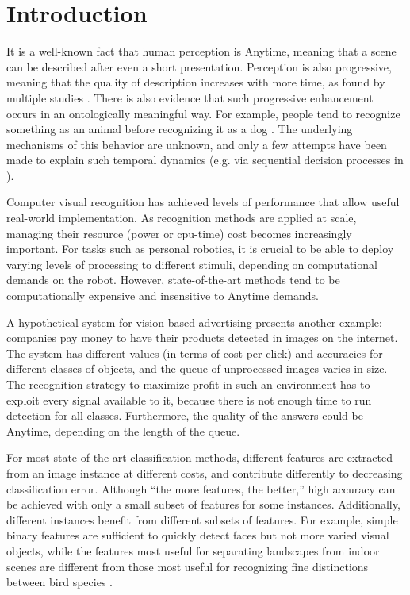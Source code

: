 \chapter{Introduction}\label{sec:introduction}

It is a well-known fact that human perception is Anytime, meaning that a scene can be described after even a short presentation.
Perception is also progressive, meaning that the quality of description increases with more time, as found by multiple studies \parencite{Vanrullen-1996,Fei-Fei-Vision-2007}.
There is also evidence that such progressive enhancement occurs in an ontologically meaningful way.
For example, people tend to recognize something as an animal before recognizing it as a dog \parencite{Mace-PloS-2009}.
The underlying mechanisms of this behavior are unknown, and only a few attempts have been made to explain such temporal dynamics (e.g. via sequential decision processes in \textcite{Hegde-Neuro-2008}).

Computer visual recognition has achieved levels of performance that allow useful real-world implementation.
As recognition methods are applied at scale, managing their resource (power or cpu-time) cost becomes increasingly important.
For tasks such as personal robotics, it is crucial to be able to deploy varying levels of processing to different stimuli, depending on computational demands on the robot.
However, state-of-the-art methods tend to be computationally expensive and insensitive to Anytime demands.

A hypothetical system for vision-based advertising presents another example: companies pay money to have their products detected in images on the internet.
The system has different values (in terms of cost per click) and accuracies for different classes of objects, and the queue of unprocessed images varies in size.
The recognition strategy to maximize profit in such an environment has to exploit every signal available to it, because there is not enough time to run detection for all classes.
Furthermore, the quality of the answers could be Anytime, depending on the length of the queue.

For most state-of-the-art classification methods, different features are extracted from an image instance at different costs, and contribute differently to decreasing classification error.
Although ``the more features, the better,'' high accuracy can be achieved with only a small subset of features for some instances.
Additionally, different instances benefit from different subsets of features.
For example, simple binary features are sufficient to quickly detect faces \parencite{Viola-IJCV-2004} but not more varied visual objects, while the features most useful for separating landscapes from indoor scenes \parencite{Xiao-CVPR-2010} are different from those most useful for recognizing fine distinctions between bird species \parencite{Farrell-ICCV-2011}.

